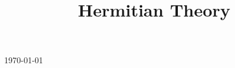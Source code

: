 

\title{Hermitian Theory}

\usepackage[sort=standard]{glossaries} 
\makeglossaries



\maketitle
\centerline{\today}
\tableofcontents







